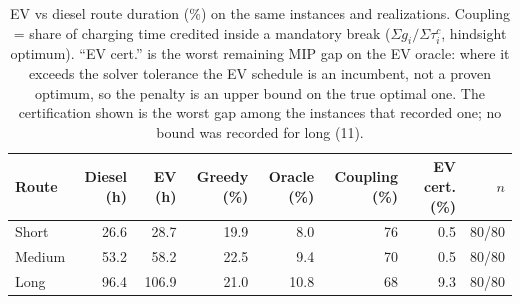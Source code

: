 \begin{table}[ht]\centering
\caption{EV vs diesel route duration (\%) on the same instances and realizations.  Coupling = share of charging time credited inside a mandatory break ($\Sigma g_i/\Sigma\tau^c_i$, hindsight optimum). ``EV cert.'' is the worst remaining MIP gap on the EV oracle: where it exceeds the solver tolerance the EV schedule is an incumbent, not a proven optimum, so the penalty is an upper bound on the true optimal one.  The certification shown is the worst gap among the instances that recorded one; no bound was recorded for long (11).}
\label{tab:diesel}
\begin{tabular}{lrrrrrrr}
\hline
Route & Diesel (h) & EV (h) & Greedy (\%) & Oracle (\%) & Coupling (\%) & EV cert. (\%) & $n$ \\
\hline
Short & 26.6 & 28.7 & 19.9 & 8.0 & 76 & 0.5 & 80/80 \\
Medium & 53.2 & 58.2 & 22.5 & 9.4 & 70 & 0.5 & 80/80 \\
Long & 96.4 & 106.9 & 21.0 & 10.8 & 68 & 9.3 & 80/80 \\
\hline
\end{tabular}
\end{table}
